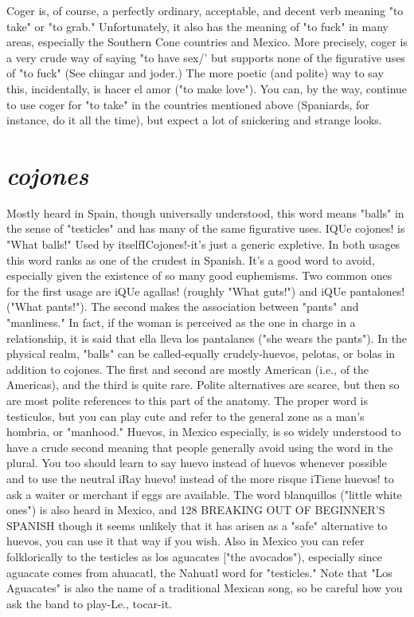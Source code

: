 \documentclass[14pt,a4paper,oneside]{memoir}
\begin{document}
Coger is, of course, a perfectly ordinary, acceptable, and decent
verb meaning "to take" or "to grab." Unfortunately, it also has the
meaning of "to fuck" in many areas, especially the Southern Cone
countries and Mexico. More precisely, coger is a very crude way of saying "to have sex/' but supports none of the figurative uses of "to fuck"
(See chingar and joder.) The more poetic (and polite) way to say this,
incidentally, is hacer el amor ("to make love"). You can, by the way,
continue to use coger for "to take" in the countries mentioned above
(Spaniards, for instance, do it all the time), but expect a lot of snickering and strange looks.

\section{\emph{cojones}}

Mostly heard in Spain, though universally understood, this
word means "balls" in the sense of "testicles" and has many of the
same figurative uses. IQUe cojones! is "What balls!" Used by itselfICojones!-it's just a generic expletive. In both usages this word ranks
as one of the crudest in Spanish. It's a good word to avoid, especially
given the existence of so many good euphemisms. Two common ones
for the first usage are iQUe agallas! (roughly "What guts!") and iQUe
pantalones! ("What pants!"). The second makes the association between "pants" and "manliness." In fact, if the woman is perceived as
the one in charge in a relationship, it is said that ella lleva los pantalanes ("she wears the pants").
In the physical realm, "balls" can be called-equally
crudely-huevos, pelotas, or bolas in addition to cojones. The first
and second are mostly American (i.e., of the Americas), and the third is
quite rare. Polite alternatives are scarce, but then so are most polite
references to this part of the anatomy. The proper word is testiculos,
but you can play cute and refer to the general zone as a man's hombria,
or "manhood."
Huevos, in Mexico especially, is so widely understood to have
a crude second meaning that people generally avoid using the word in
the plural. You too should learn to say huevo instead of huevos whenever possible and to use the neutral iRay huevo! instead of the more
risque iTiene huevos! to ask a waiter or merchant if eggs are available.
The word blanquillos ("little white ones") is also heard in Mexico, and
128 BREAKING OUT OF BEGINNER'S SPANISH
though it seems unlikely that it has arisen as a "safe" alternative to
huevos, you can use it that way if you wish. Also in Mexico you can
refer folklorically to the testicles as los aguacates ["the avocados"),
especially since aguacate comes from ahuacatl, the Nahuatl word
for "testicles." Note that "Los Aguacates" is also the name of a traditional Mexican song, so be careful how you ask the band to play-Le.,
tocar-it.
\end{document}
